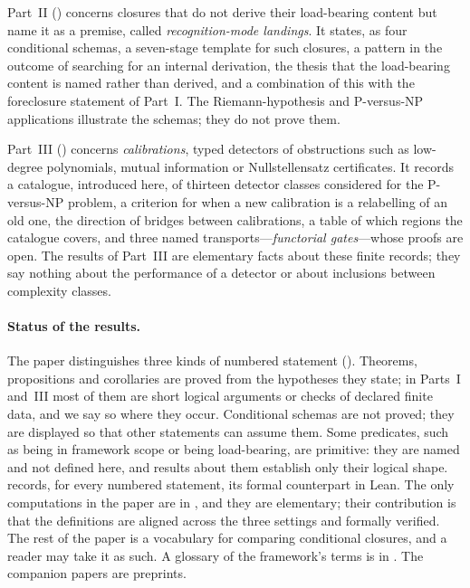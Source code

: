Part~II () concerns closures that do not derive
their load-bearing content but name it as a premise, called
\emph{recognition-mode landings}.  It states, as four conditional
schemas, a seven-stage template for such closures, a pattern in the
outcome of searching for an internal derivation, the thesis that the
load-bearing content is named rather than derived, and a combination of
this with the foreclosure statement of Part~I.  The Riemann-hypothesis
and P-versus-NP applications illustrate the schemas; they do not prove
them.

Part~III () concerns \emph{calibrations}, typed
detectors of obstructions such as low-degree polynomials, mutual
information or Nullstellensatz certificates.  It records a catalogue,
introduced here, of thirteen detector classes considered for the
P-versus-NP problem, a criterion for
when a new calibration is a relabelling of an old one, the direction of
bridges between calibrations, a table of which regions the catalogue
covers, and three named transports---\emph{functorial gates}---whose
proofs are open.  The results of Part~III are elementary facts about
these finite records; they say nothing about the performance of a
detector or about inclusions between complexity classes.

\paragraph{Status of the results.}  The paper distinguishes three
kinds of numbered statement ().
Theorems, propositions and corollaries are proved from the hypotheses
they state; in Parts~I and~III most of them are short logical arguments
or checks of declared finite data, and we say so where they occur.  Conditional schemas are not proved; they are displayed so
that other statements can assume them.  Some predicates, such as being
in framework scope or being load-bearing, are primitive: they are named
and not defined here, and results about them establish only their
logical shape.   records, for every numbered
statement, its formal counterpart in Lean.  The only computations in
the paper are in , and they
are elementary; their contribution is that the definitions are aligned
across the three settings and formally verified.  The rest of the paper
is a vocabulary for comparing conditional closures, and a reader may
take it as such.
A glossary of the framework's terms is in
.  The companion papers are preprints.

